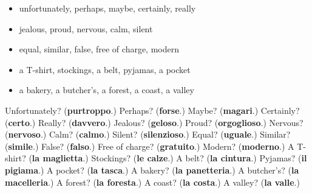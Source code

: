 \begin{itemize}
\raggedright
  \item unfortunately, perhaps, maybe, certainly, really
  \item jealous, proud, nervous, calm, silent
  \item equal, similar, false, free of charge, modern
  \item a T-shirt, stockings, a belt, pyjamas, a pocket
  \item a bakery, a butcher's, a forest, a coast, a valley
\end{itemize}

\begin{tcolorbox}[breakable,colback=teal!4,colframe=teal!35!black,title={Before you move on}]
Unfortunately? (\textbf{purtroppo}.) Perhaps? (\textbf{forse}.) Maybe? (\textbf{magari}.) Certainly? (\textbf{certo}.) Really? (\textbf{davvero}.) Jealous? (\textbf{geloso}.) Proud? (\textbf{orgoglioso}.) Nervous? (\textbf{nervoso}.) Calm? (\textbf{calmo}.) Silent? (\textbf{silenzioso}.) Equal? (\textbf{uguale}.) Similar? (\textbf{simile}.) False? (\textbf{falso}.) Free of charge? (\textbf{gratuito}.) Modern? (\textbf{moderno}.) A T-shirt? (\textbf{la maglietta}.) Stockings? (\textbf{le calze}.) A belt? (\textbf{la cintura}.) Pyjamas? (\textbf{il pigiama}.) A pocket? (\textbf{la tasca}.) A bakery? (\textbf{la panetteria}.) A butcher's? (\textbf{la macelleria}.) A forest? (\textbf{la foresta}.) A coast? (\textbf{la costa}.) A valley? (\textbf{la valle}.)
\end{tcolorbox}
